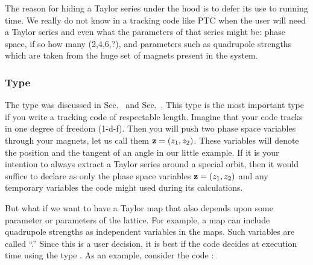 \documentclass{hitec}     %
\begin{document}
The reason for hiding a Taylor series under the hood is to defer its use to running time. We really do not know in a tracking code like PTC when the user will need a Taylor series and even what the parameters of that series might be: phase space, if so how many (2,4,6,?), and parameters such as quadrupole strengths which are taken from the huge set of magnets present in the system.

\subsubsection{Type \protect{}}  \label{sec:real8code}

The  type was discussed in Sec.~ and Sec.~.
This type is the most important type if you write a tracking code of respectable length.  Imagine that your code tracks in one degree of freedom (1-d-f). Then you will push two phase space variables through your magnets, let us call them ${\bf z}=(z_1,z_2)$. These variables will denote  the position and the tangent of an angle in our little example.  If it is your  intention to always extract a Taylor series around a special orbit, then  it would suffice to declare as  only the phase space variables ${\bf z}=(z_1,z_2)$ and any temporary variables the code might used during its calculations. 

But what if we want to have a Taylor map that also depends upon some parameter or parameters of the lattice. For example, a map can include quadrupole strengths as independent variables in the maps. Such variables are called ``.'' Since this is a user decision, it is best if the code decides at execution time using the type .
As an example, consider the code :
\end{document}
